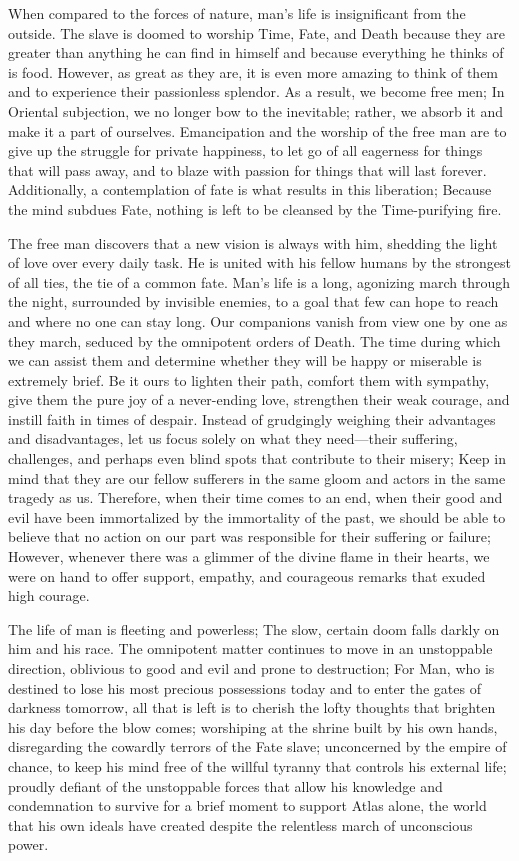 \documentclass[a4paper,12pt]{book}[2004/02/16]
\theoremstyle{ilemma}
\theoremstyle{itheorem}
\theoremstyle{iother}
\theoremstyle{icorollary}
\theoremstyle{numcorollary}
\theoremstyle{idefinition}
\begin{document}
When compared to the forces of nature, man's life is insignificant from the outside. The slave is doomed to worship Time, Fate, and Death because they are greater than anything he can find in himself and because everything he thinks of is food.
However, as great as they are, it is even more amazing to think of them and to experience their passionless splendor. As a result, we become free men; In Oriental subjection, we no longer bow to the inevitable; rather, we absorb it and make it a part of ourselves. Emancipation and the worship of the free man are to give up the struggle for private happiness, to let go of all eagerness for things that will pass away, and to blaze with passion for things that will last forever. Additionally, a contemplation of fate is what results in this liberation; Because the mind subdues Fate, nothing is left to be cleansed by the Time-purifying fire.

The free man discovers that a new vision is always with him, shedding the light of love over every daily task. He is united with his fellow humans by the strongest of all ties, the tie of a common fate. Man's life is a long, agonizing march through the night, surrounded by invisible enemies, to a goal that few can hope to reach and where no one can stay long. Our companions vanish from view one by one as they march, seduced by the omnipotent orders of Death. The time during which we can assist them and determine whether they will be happy or miserable is extremely brief. Be it ours to lighten their path, comfort them with sympathy, give them the pure joy of a never-ending love, strengthen their weak courage, and instill faith in times of despair. Instead of grudgingly weighing their advantages and disadvantages, let us focus solely on what they need—their suffering, challenges, and perhaps even blind spots that contribute to their misery; Keep in mind that they are our fellow sufferers in the same gloom and actors in the same tragedy as us. Therefore, when their time comes to an end, when their good and evil have been immortalized by the immortality of the past, we should be able to believe that no action on our part was responsible for their suffering or failure; However, whenever there was a glimmer of the divine flame in their hearts, we were on hand to offer support, empathy, and courageous remarks that exuded high courage.

The life of man is fleeting and powerless; The slow, certain doom falls darkly on him and his race. The omnipotent matter continues to move in an unstoppable direction, oblivious to good and evil and prone to destruction; For Man, who is destined to lose his most precious possessions today and to enter the gates of darkness tomorrow, all that is left is to cherish the lofty thoughts that brighten his day before the blow comes; worshiping at the shrine built by his own hands, disregarding the cowardly terrors of the Fate slave; unconcerned by the empire of chance, to keep his mind free of the willful tyranny that controls his external life; proudly defiant of the unstoppable forces that allow his knowledge and condemnation to survive for a brief moment to support Atlas alone, the world that his own ideals have created despite the relentless march of unconscious power.
\end{document}
